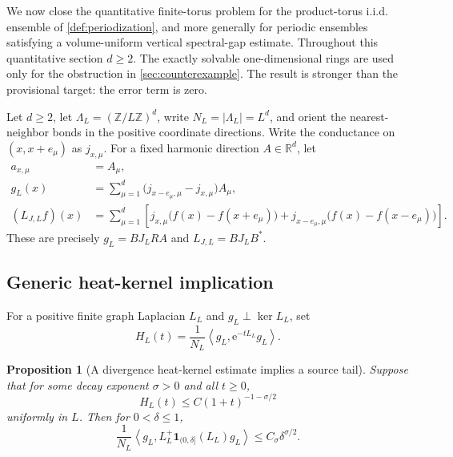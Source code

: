 \documentclass[11pt]{article}
\newtheorem{proposition}[theorem]{Proposition}
\theoremstyle{definition}
\theoremstyle{remark}
\newcommand{\e}{\mathrm e}
\newcommand{\R}{\mathbb R}
\newcommand{\Z}{\mathbb Z}
\newcommand{\ip}[2]{\left\langle #1,#2\right\rangle}
\newcommand{\abs}[1]{\left\lvert #1\right\rvert}
\begin{document}
We now close the quantitative finite-torus problem for the product-torus i.i.d. ensemble of \cref{def:periodization}, and more generally for periodic ensembles satisfying a volume-uniform vertical spectral-gap estimate.  Throughout this quantitative section $d\ge2$.  The exactly solvable one-dimensional rings are used only for the obstruction in \cref{sec:counterexample}.  The result is stronger than the provisional target: the error term is zero.

Let $d\ge2$, let $\Lambda_L=(\Z/L\Z)^d$, write $N_L=\abs{\Lambda_L}=L^d$, and orient the nearest-neighbor bonds in the positive coordinate directions.  Write the conductance on $(x,x+e_\mu)$ as $j_{x,\mu}$.  For a fixed harmonic direction $A\in\R^d$, let
\begin{align}
 a_{x,\mu}&=A_\mu,\\
 g_L(x)&=\sum_{\mu=1}^d
 \bigl(j_{x-e_\mu,\mu}-j_{x,\mu}\bigr)A_\mu,
 \label{eq:torus-drift-coordinate}\\
 (L_{J,L}f)(x)&=\sum_{\mu=1}^d\left[
 j_{x,\mu}\bigl(f(x)-f(x+e_\mu)\bigr)
 +j_{x-e_\mu,\mu}\bigl(f(x)-f(x-e_\mu)\bigr)
 \right].
 \label{eq:torus-laplacian-coordinate}
\end{align}
These are precisely $g_L=BJ_LRA$ and $L_{J,L}=BJ_LB^*$.

\subsection{Generic heat-kernel implication}

For a positive finite graph Laplacian $L_L$ and $g_L\perp\ker L_L$, set
\begin{equation}
 H_L(t)=\frac1{N_L}\ip{g_L}{\e^{-tL_L}g_L}.
 \label{eq:heat-correlation}
\end{equation}

\begin{proposition}[A divergence heat-kernel estimate implies a source tail]
\label{prop:heat-tail}
Suppose that for some decay exponent $\sigma>0$ and all $t\ge0$,
\begin{equation}
 H_L(t)\le C(1+t)^{-1-\sigma/2}
 \label{eq:heat-assumption}
\end{equation}
uniformly in $L$.  Then for $0<\delta\le1$,
\begin{equation}
 \frac1{N_L}\ip{g_L}{L_L^+
 \bm{1}_{(0,\delta]}(L_L)g_L}
 \le C_\sigma\delta^{\sigma/2}.
 \label{eq:heat-tail}
\end{equation}
\end{proposition}
\end{document}

